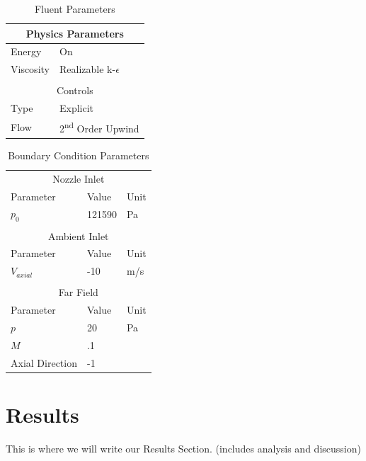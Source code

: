 \documentclass[12pt]{article} %
\begin{document}
\begin{table}[ht]
    \caption{Fluent Parameters}
    \centering
    \begin{tabular}{l|l}
        \multicolumn{2}{c}{Physics Parameters}\\
        \hline
        Energy&On\\
        Viscosity&Realizable k-$\epsilon$\\
        \hline
        \multicolumn{2}{c}{}\\
        \multicolumn{2}{c}{Controls}\\
        \hline
        Type&Explicit\\
        Flow&2\textsuperscript{nd} Order Upwind\\
        \hline
    \end{tabular}
    \label{tab:parameter1}
\end{table}

\begin{table}[ht]
    \caption{Boundary Condition Parameters}
    \centering
    \begin{tabular}{l|l|l}
        \multicolumn{3}{c}{Nozzle Inlet}\\
        Parameter&Value&Unit\\
        \hline
        $p_0$&121590&Pa\\
        \hline
        \multicolumn{3}{c}{}\\
        \multicolumn{3}{c}{Ambient Inlet}\\
        Parameter&Value&Unit\\
        \hline
        $V_{axial}$&-10&m/s\\
        \hline
        \multicolumn{3}{c}{}\\
        \multicolumn{3}{c}{Far Field}\\
        Parameter&Value&Unit\\
        \hline
        $p$&20&Pa\\
        $M$&.1&\\
        Axial Direction&-1&\\
        \hline
    \end{tabular}
    \label{tab:parameter2}
\end{table}

\clearpage
\section{Results}
This is where we will write our Results Section.  (includes analysis and discussion)
\end{document}
